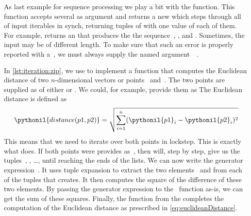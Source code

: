 %
%
%
%
\begin{sloppypar}%
As last example for sequence processing we play a bit with the  function.
This function accepts several  as argument and returns a new  which steps through all of input iterables in synch, returning tuples of with one value of each of them.
For example,  returns an  that produces the the sequence~, , and .
Sometimes, the input  may be of different length.
To make sure that such an error is properly reported with a~, we must always supply the named argument~~\cite{PEP618}.%
\end{sloppypar}%
%
In \cref{lst:iteration:zip}, we use  to implement a function  that computes the Euclidean distance of two $n$\nobreakdashes-dimensional vectors or points~ and~.
The two points are supplied as  of either  or .
We could, for example, provide them as 
The Euclidean distance is defined as%
%
\begin{equation}%
\pythonil{distance(p1, p2)} = \sqrt{\sum_{i=1}^n (\pythonil{p1}_i - \pythonil{p2}_i)^2}%
\label{eq:euclideanDistance}%
\end{equation}%
%
This means that we need to iterate over both points in lockstep.
This is exactly what  does.
If both points were provides as~, then  will, step by step, give us the tuples~, , {\dots}, until reaching the ends of the lists.
We can now write the generator expression~.
It uses tuple expansion to extract the two elements~ and  from each of the tuples that  creates.
It then computes the square of the difference of these two elements.
By passing the generator expression to the~ function as-is, we can get the sum of these squares.
Finally, the  function from the  completes the computation of the Euclidean distance as prescribed in \cref{eq:euclideanDistance}.

